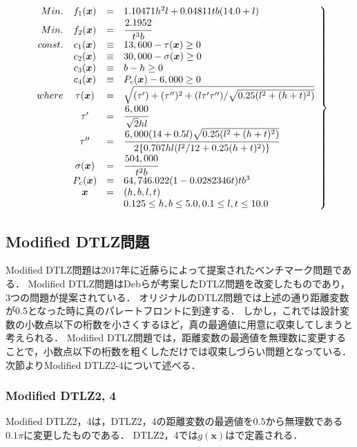 \documentclass[../main/main]{subfiles}
\begin{document}
\begin{eqnarray}
\left.
\begin{array}{rccl}
Min. & f_1(\bm x) &=& 1.10471h^2l + 0.04811tb(14.0 + l) \\ 
Min. & f_2(\bm x) &=& \cfrac{2.1952}{t^3b}\\
const. &c_1(\bm x) &\equiv& 13,600 - \tau(\bm x) \geq 0\\
          & c_2(\bm x) &\equiv& 30,000 - \sigma(\bm x) \geq 0 \\
          & c_3(\bm x) &\equiv& b-h \geq 0 \\
          & c_4(\bm x) &\equiv& P_c(\bm x) - 6,000 \geq 0\\

where &\tau(\bm x) & = & \sqrt{(\tau^\prime) + (\tau^{\prime \prime})^2 + (l \tau^\prime \tau^{\prime \prime}) / \sqrt{0.25(l^2 + (h+t)^2)}}\\
           &\tau^\prime & = & \cfrac{6,000}{\sqrt{2}hl}\\
           &\tau^{\prime \prime} &=& \cfrac{6,000(14 + 0.5l)\sqrt{0.25(l^2 + (h+t)^2)}}{2\{0.707hl(l^2/12+0.25(h+t)^2)\}}\\
           &\sigma(\bm x) &=& \cfrac{504,000}{t^2b}\\
           &P_c(\bm x) &=& 64,746.022(1-0.0282346t)tb^3\\
           & \bm x &=& (h, b, l, t)\\
           & & & 0.125 \leq h,b \leq 5.0, 0.1 \leq l,t \leq 10.0\\
\end{array}
\right\}
\label{wbd_eq}
\end{eqnarray}

\newpage

\subsection{Modified DTLZ問題}
Modified DTLZ問題\cite{}は2017年に近藤らによって提案されたベンチマーク問題である．
Modified DTLZ問題はDebらが考案したDTLZ問題を改変したものであり，3つの問題が提案されている．
オリジナルのDTLZ問題では上述の通り距離変数が0.5となった時に真のパレートフロントに到達する．
しかし，これでは設計変数の小数点以下の桁数を小さくするほど，真の最適値に用意に収束してしまうと考えられる．
Modified DTLZ問題では，距離変数の最適値を無理数に変更することで，小数点以下の桁数を粗くしただけでは収束しづらい問題となっている．
次節よりModified DTLZ2-4について述べる．

\subsubsection{Modified DTLZ2, 4}
Modified DTLZ2，4は，DTLZ2，4の距離変数の最適値を$0.5$から無理数である$0.1\pi$に変更したものである．
DTLZ2，4では$g(\bm x)$はで定義される．
\end{document}
